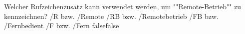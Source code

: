     {Welcher Rufzeichenzusatz kann verwendet werden, um ""Remote-Betrieb"" zu kennzeichnen?}
    {/R bzw. /Remote}
    {/RB bzw. /Remotebetrieb}
    {/FB bzw. /Fernbedient}
    {/F bzw. /Fern}
    {false}{false}